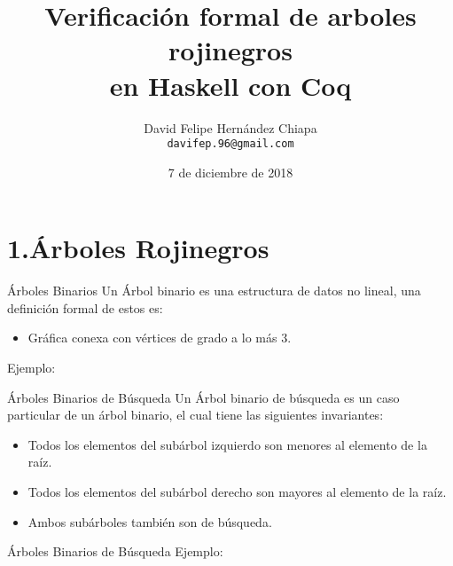 \documentclass[xcolor=dvipsnames,table,handout]{beamer}
\title[]{Verificación formal de arboles rojinegros \\ en Haskell con Coq}
\author[David Hernández Chiapa]{David Felipe Hernández Chiapa \\
    \small{\texttt{davifep.96@gmail.com}}}
\institute[UNAM-FC]{Facultad de Ciencias \\
Universidad Nacional Aut\'onoma de M\'exico \\ \small{Proyecto 
PAPIME PE102117}}
\date[]{\small{7 de diciembre de 2018}}
\begin{document}
\frame{\titlepage}

\section{1.Árboles Rojinegros}
\begin{frame}{Árboles Binarios}
Un Árbol binario es una estructura de datos no lineal, una definición formal de 
estos es:
\begin{itemize}
    \item Gráfica conexa con vértices de grado a lo más 3.
\end{itemize}
Ejemplo:

\centering
\end{frame}

\begin{frame}{Árboles Binarios de Búsqueda}
Un Árbol binario de búsqueda es un caso particular de  un árbol binario, el 
cual tiene las siguientes invariantes:
\begin{itemize}
    \item Todos los elementos del subárbol izquierdo son menores al elemento de 
la raíz.
    \item Todos los elementos del subárbol derecho son mayores al elemento de la 
raíz.
    \item Ambos subárboles también son de búsqueda.
\end{itemize}

\end{frame}


\begin{frame}{Árboles Binarios de Búsqueda}
Ejemplo:

\centering

\end{frame}
\end{document}
